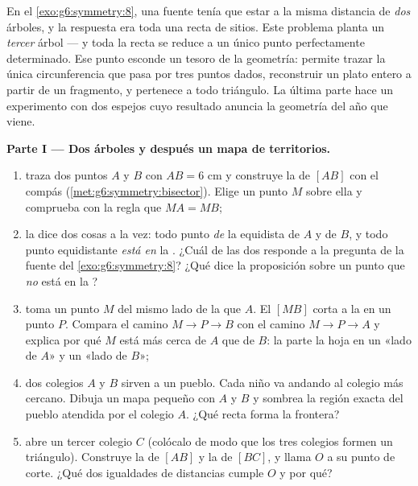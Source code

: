\begin{problem}
\label{pb:g6:symmetry:1}
En el \cref{exo:g6:symmetry:8}, una fuente tenía que estar a la misma
distancia de \emph{dos} árboles, y la respuesta era toda una recta de
sitios. Este problema planta un \emph{tercer} árbol --- y toda la
recta se reduce a un único punto perfectamente determinado. Ese
punto esconde un tesoro de la geometría: permite trazar la única
circunferencia que pasa por tres puntos dados, reconstruir un plato entero
a partir de un fragmento, y pertenece a todo triángulo. La última
parte hace un experimento con dos espejos cuyo resultado
anuncia la geometría del año que viene.

\medskip
\noindent\textbf{Parte I --- Dos árboles y después un mapa de
territorios.}
\begin{enumerate}
  \item traza dos puntos $A$ y $B$ con $AB = 6$ cm y
        construye la  de $[AB]$ con el
        compás (\cref{met:g6:symmetry:bisector}). Elige un punto
        $M$ sobre ella y comprueba con la regla que $MA = MB$;
  \item la  dice dos cosas a la
        vez: todo punto \emph{de} la  equidista
        de $A$ y de $B$, y todo punto equidistante \emph{está
        en} la . ¿Cuál de las dos responde a la pregunta de la
        fuente del \cref{exo:g6:symmetry:8}? ¿Qué dice la
        proposición sobre un punto que \emph{no} está en la
        ?
  \item toma un punto $M$ del mismo lado de la  que
        $A$. El  $[MB]$ corta a la  en un punto
        $P$. Compara el camino $M \to P \to B$ con el camino
        $M \to P \to A$ y explica por qué $M$ está más cerca de $A$
        que de $B$: la  parte la hoja en un
        «lado de $A$» y un «lado de $B$»;
  \item dos colegios $A$ y $B$ sirven a un pueblo. Cada niño va
        andando al colegio más cercano. Dibuja un mapa pequeño con $A$ y $B$
        y sombrea la región exacta del pueblo atendida por el colegio
        $A$. ¿Qué recta forma la frontera?
  \item abre un tercer colegio $C$ (colócalo de modo que los tres colegios
        formen un triángulo). Construye la 
        de $[AB]$ y la  de $[BC]$, y
        llama $O$ a su punto de corte. ¿Qué dos igualdades de
        distancias cumple $O$ y por qué?
\end{enumerate}


\end{problem}
